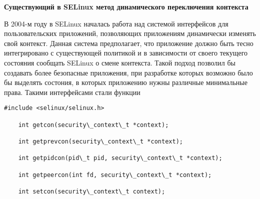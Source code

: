 
\bigskip 
{\bfseries Существующий в SELinux метод динамического 
переключения контекста} 

В 2004-м году в SELinux началась работа над системой 
интерфейсов для пользовательских приложений, позволяющих
приложениям динамически изменять свой контекст. Данная 
система предполагает, что приложение должно быть тесно 
интегрировано с существующей политикой и в зависимости 
от своего текущего состояния сообщать SELinux о смене 
контекста. Такой подход позволил бы создавать более 
безопасные приложения, при разработке которых возможно
было бы выделять состония, в которых приложению нужны
различные минимальные права. Такими интерфейсами стали 
функции 

\bigskip 
\begin{lstlisting} 
#include <selinux/selinux.h>

	int getcon(security\_context\_t *context);

	int getprevcon(security\_context\_t *context);

	int getpidcon(pid\_t pid, security\_context\_t *context);

	int getpeercon(int fd, security\_context\_t *context);

	int setcon(security\_context\_t context);
\end{lstlisting}
